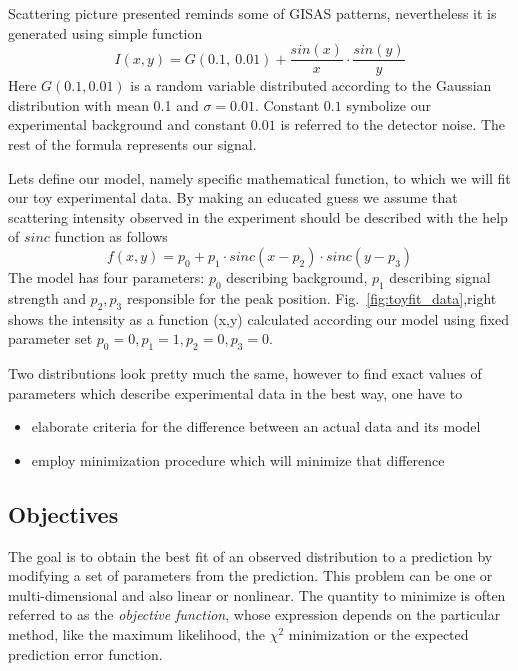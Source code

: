 Scattering picture presented reminds some of GISAS patterns, nevertheless it is
generated using simple function
$$I(x,y) = G(0.1,~0.01) + \frac{sin(x)}{x} \cdot \frac{sin(y)}{y}$$
Here $G(0.1, 0.01)$ is a random variable distributed according to the Gaussian distribution
with mean 0.1 and $\sigma=0.01$.
Constant $0.1$ symbolize our experimental background and constant $0.01$ is referred
to the detector noise. The rest of the formula represents our signal.

Lets define our model, namely specific mathematical function, to which we will fit our toy experimental data. By making an educated guess we assume that scattering intensity observed
in the experiment should be described with the help of $sinc$ function as follows
$$ f(x,y) = p_0 + p_1 \cdot  sinc(x - p_2) \cdot sinc(y - p_3) $$
The model has four parameters: $p_0$ describing background, $p_{1}$ describing signal strength
and $p_2,p_3$ responsible for the peak position.
Fig.~\ref{fig:toyfit_data},right shows the intensity as a function (x,y) calculated according
our model using fixed parameter set $p_0=0,p_1=1,p_2=0,p_3=0$. 

Two distributions look pretty much the same, however to find exact values of parameters which describe experimental data in the best way, one have to
\begin{itemize}
\item elaborate criteria for the difference between an actual data and its model
\item employ minimization procedure which will minimize that difference
\end{itemize}


\subsection{Objectives}

The goal is to obtain the best fit of an observed distribution
to a prediction by modifying a set of parameters from the
prediction. This problem can be one or multi-dimensional and also linear or
nonlinear. The quantity to minimize is often referred to as the
\textit{objective function}, whose expression depends on the
particular method, like the maximum likelihood, the $\chi^2$
minimization or the expected prediction error function. 

